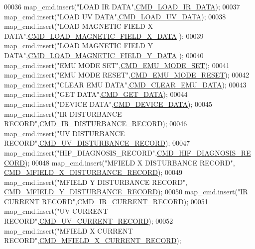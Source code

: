 \begin{DoxyCode}
00036     map\_cmd.insert(\textcolor{stringliteral}{"LOAD IR DATA"},\hyperlink{a00031_a8c7ce698ee79d20e30eb0ac08f0d9abc}{CMD\_LOAD\_IR\_DATA});
00037     map\_cmd.insert(\textcolor{stringliteral}{"LOAD UV DATA"},\hyperlink{a00031_a8904f57ef5850374dbcdbe67eb8a5543}{CMD\_LOAD\_UV\_DATA});
00038     map\_cmd.insert(\textcolor{stringliteral}{"LOAD MAGNETIC FIELD X DATA"},\hyperlink{a00031_a9e5d9d302e44daccbe233d321696b12c}{CMD\_LOAD\_MAGNETIC\_FIELD\_X\_DATA}
      );
00039     map\_cmd.insert(\textcolor{stringliteral}{"LOAD MAGNETIC FIELD Y DATA"},\hyperlink{a00031_ace011e2ba41b184650e8bd0ddbfa00d2}{CMD\_LOAD\_MAGNETIC\_FIELD\_Y\_DATA}
      );
00040     map\_cmd.insert(\textcolor{stringliteral}{"EMU MODE SET"},\hyperlink{a00031_ac80fdfdbada05f61256bef39c2064330}{CMD\_EMU\_MODE\_SET});
00041     map\_cmd.insert(\textcolor{stringliteral}{"EMU MODE RESET"},\hyperlink{a00031_a48532ee6ce8c4c41bc6a972f66998ca6}{CMD\_EMU\_MODE\_RESET});
00042     map\_cmd.insert(\textcolor{stringliteral}{"CLEAR EMU DATA"},\hyperlink{a00031_aa5f71f685588bc4e978cd6d595a5ea81}{CMD\_CLEAR\_EMU\_DATA});
00043     map\_cmd.insert(\textcolor{stringliteral}{"GET DATA"},\hyperlink{a00031_af89ae6f2252e558fc6e54ea9b452bf0e}{CMD\_GET\_DATA});
00044     map\_cmd.insert(\textcolor{stringliteral}{"DEVICE DATA"},\hyperlink{a00031_a4412fcb90fb9171d432a624428881e70}{CMD\_DEVICE\_DATA});
00045     map\_cmd.insert(\textcolor{stringliteral}{"IR DISTURBANCE RECORD"},\hyperlink{a00031_ad37cd290161f0a245d189c3f4e014d4e}{CMD\_IR\_DISTURBANCE\_RECORD});
00046     map\_cmd.insert(\textcolor{stringliteral}{"UV DISTURBANCE RECORD"},\hyperlink{a00031_ae45bb46748497c6a117beb1e93072d83}{CMD\_UV\_DISTURBANCE\_RECORD});
00047     map\_cmd.insert(\textcolor{stringliteral}{"HIF\_DIAGNOSIS\_RECORD"},\hyperlink{a00031_a185ed5442d69c7c8abba13323a8e8187}{CMD\_HIF\_DIAGNOSIS\_RECORD});
00048     map\_cmd.insert(\textcolor{stringliteral}{"MFIELD X  DISTURBANCE RECORD"},
      \hyperlink{a00031_ab84aea346a3f75b58f8bda67b8ae9be0}{CMD\_MFIELD\_X\_DISTURBANCE\_RECORD});
00049     map\_cmd.insert(\textcolor{stringliteral}{"MFIELD Y  DISTURBANCE RECORD"},
      \hyperlink{a00031_af77e9c0ad32b3cc50d61992d4b64a831}{CMD\_MFIELD\_Y\_DISTURBANCE\_RECORD});
00050     map\_cmd.insert(\textcolor{stringliteral}{"IR CURRENT RECORD"},\hyperlink{a00031_a4dcce4fd3ff29eb6782f3228901f99cf}{CMD\_IR\_CURRENT\_RECORD});
00051     map\_cmd.insert(\textcolor{stringliteral}{"UV CURRENT RECORD"},\hyperlink{a00031_ab0e0364ddc2d95d1e5b51a3e3ff50918}{CMD\_UV\_CURRENT\_RECORD});
00052     map\_cmd.insert(\textcolor{stringliteral}{"MFIELD X  CURRENT RECORD"},\hyperlink{a00031_ab796345ffdbc6a240b67b56583bb77c6}{CMD\_MFIELD\_X\_CURRENT\_RECORD});

\end{DoxyCode}
